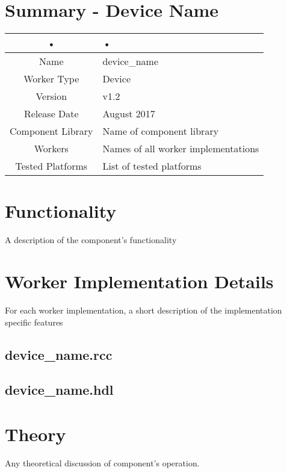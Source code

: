 \documentclass{article}
\author{} %
\date{Version \docVersion} %
\title{\docTitle}
\def\docVersion{1.2}
\def\comp{device\_name}
\def\Comp{Device Name}
\begin{document}
\section*{Summary - \Comp}
\begin{tabular}{|c|M{13.5cm}|}
	\hline
	•               & •                                 \\
	\hline
	Name              & \comp                               \\
	\hline
	Worker Type       & Device                              \\
	\hline
	Version           & v\docVersion                               \\
	\hline
	Release Date      & August 2017                        \\
	\hline
	Component Library & Name of component library           \\
	\hline
	Workers           & Names of all worker implementations \\
	\hline
	Tested Platforms  & List of tested platforms            \\
	\hline
\end{tabular}

\section*{Functionality}
\begin{flushleft}
	A description of the component's functionality
\end{flushleft}

\section*{Worker Implementation Details}
\begin{flushleft}
	For each worker implementation, a short description of the implementation specific features
	\subsection*{\comp.rcc}
	\subsection*{\comp.hdl}
\end{flushleft}

\section*{Theory}
\begin{flushleft}
	Any theoretical discussion of component's operation.
\end{flushleft}
\end{document}
